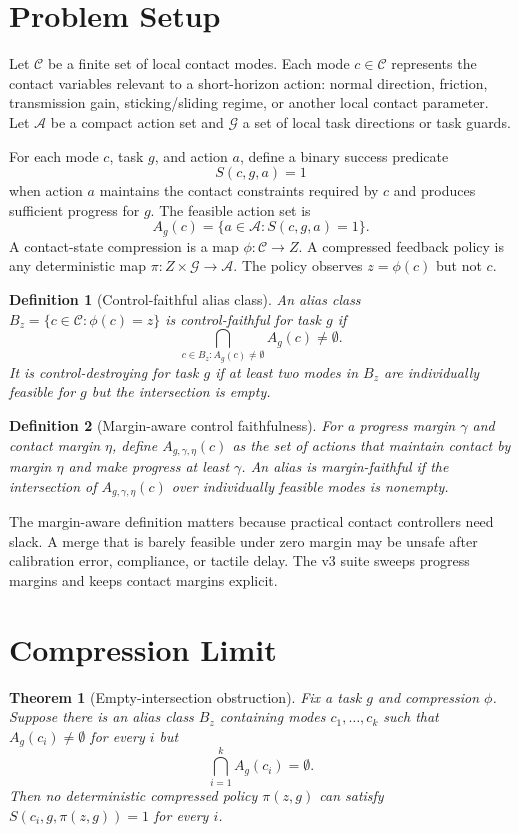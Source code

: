 \documentclass{article}
\newtheorem{theorem}{Theorem}
\newtheorem{definition}{Definition}
\newcommand{\modes}{\mathcal{C}}
\newcommand{\acts}{\mathcal{A}}
\newcommand{\tasks}{\mathcal{G}}
\newcommand{\compress}{\phi}
\newcommand{\alias}{B_z}
\begin{document}
\section{Problem Setup}
Let $\modes$ be a finite set of local contact modes. Each mode $c\in\modes$ represents the contact variables relevant to a short-horizon action: normal direction, friction, transmission gain, sticking/sliding regime, or another local contact parameter. Let $\acts$ be a compact action set and $\tasks$ a set of local task directions or task guards.

For each mode $c$, task $g$, and action $a$, define a binary success predicate
\[
S(c,g,a)=1
\]
when action $a$ maintains the contact constraints required by $c$ and produces sufficient progress for $g$. The feasible action set is
\[
A_g(c)=\{a\in\acts:S(c,g,a)=1\}.
\]
A contact-state compression is a map $\compress:\modes\rightarrow Z$. A compressed feedback policy is any deterministic map $\pi:Z\times \tasks\rightarrow \acts$. The policy observes $z=\compress(c)$ but not $c$.

\begin{definition}[Control-faithful alias class]
An alias class $\alias=\{c\in\modes:\compress(c)=z\}$ is control-faithful for task $g$ if
\[
\bigcap_{c\in \alias: A_g(c)\neq\emptyset} A_g(c)\neq\emptyset.
\]
It is control-destroying for task $g$ if at least two modes in $\alias$ are individually feasible for $g$ but the intersection is empty.
\end{definition}

\begin{definition}[Margin-aware control faithfulness]
For a progress margin $\gamma$ and contact margin $\eta$, define $A_{g,\gamma,\eta}(c)$ as the set of actions that maintain contact by margin $\eta$ and make progress at least $\gamma$. An alias is margin-faithful if the intersection of $A_{g,\gamma,\eta}(c)$ over individually feasible modes is nonempty.
\end{definition}

The margin-aware definition matters because practical contact controllers need slack. A merge that is barely feasible under zero margin may be unsafe after calibration error, compliance, or tactile delay. The v3 suite sweeps progress margins and keeps contact margins explicit.

\section{Compression Limit}
\begin{theorem}[Empty-intersection obstruction]
Fix a task $g$ and compression $\compress$. Suppose there is an alias class $\alias$ containing modes $c_1,\ldots,c_k$ such that $A_g(c_i)\neq\emptyset$ for every $i$ but
\[
\bigcap_{i=1}^k A_g(c_i)=\emptyset.
\]
Then no deterministic compressed policy $\pi(z,g)$ can satisfy $S(c_i,g,\pi(z,g))=1$ for every $i$.
\end{theorem}
\end{document}
